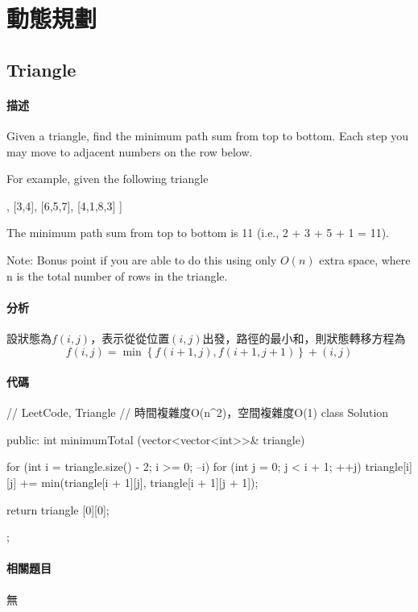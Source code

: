 \chapter{動態規劃}


\section{Triangle} %
\label{sec:triangle}


\subsubsection{描述}
Given a triangle, find the minimum path sum from top to bottom. Each step you may move to adjacent numbers on the row below.

For example, given the following triangle
\begin{Code}
[
     [2],
    [3,4],
   [6,5,7],
  [4,1,8,3]
]
\end{Code}
The minimum path sum from top to bottom is 11 (i.e., 2 + 3 + 5 + 1 = 11).

Note: Bonus point if you are able to do this using only $O(n)$ extra space, where n is the total number of rows in the triangle.


\subsubsection{分析}
設狀態為$f(i, j)$，表示從從位置$(i,j)$出發，路徑的最小和，則狀態轉移方程為
$$
f(i,j)=\min\left\{f(i+1,j),f(i+1,j+1)\right\}+(i,j)
$$


\subsubsection{代碼}
\begin{Code}
// LeetCode, Triangle
// 時間複雜度O(n^2)，空間複雜度O(1)
class Solution {
public:
    int minimumTotal (vector<vector<int>>& triangle) {
        for (int i = triangle.size() - 2; i >= 0; --i)
            for (int j = 0; j < i + 1; ++j)
                triangle[i][j] += min(triangle[i + 1][j],
                        triangle[i + 1][j + 1]);

        return triangle [0][0];
    }
};
\end{Code}


\subsubsection{相關題目}
\begindot
\item 無
\myenddot


